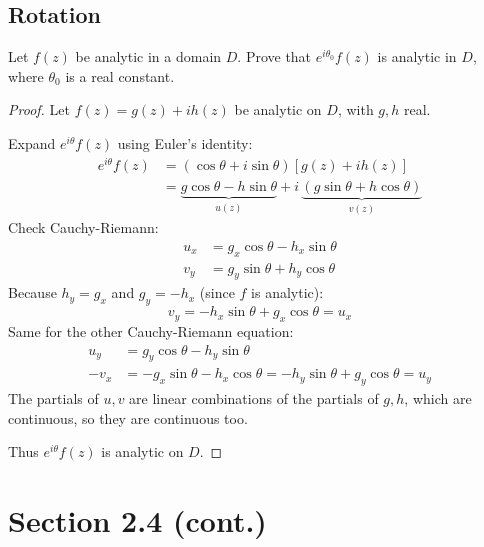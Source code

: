 \documentclass{article}
\begin{document}
\subsection*{Rotation}
Let $f(z)$ be analytic in a domain $D$. Prove that $e^{i\theta_0} f(z)$ is
analytic in $D$, where $\theta_0$ is a real constant.
\begin{proof}
  Let $f(z) = g(z) + ih(z)$ be analytic on $D$, with $g, h$ real.

  Expand $e^{i\theta} f(z)$ using Euler's identity:
  \begin{align*}
    e^{i\theta} f(z)
    &= (\cos\theta + i\sin\theta)\left[g(z) + ih(z)\right]
    \\ &= \underbrace{g\cos\theta - h\sin\theta}_{u(z)}
       + i\,\underbrace{\left(g\sin\theta + h\cos\theta\right)}_{v(z)}
  \end{align*}
  Check Cauchy-Riemann:
  \begin{align*}
    u_x &= g_x\cos\theta - h_x\sin\theta
    \\ v_y &= g_y\sin\theta + h_y\cos\theta
  \end{align*}
  Because $h_y = g_x$ and $g_y = -h_x$ (since $f$ is analytic):
  \[
    v_y = -h_x\sin\theta + g_x\cos\theta = u_x
  \]
  Same for the other Cauchy-Riemann equation:
  \begin{align*}
    u_y &= g_y\cos\theta - h_y\sin\theta
    \\ -v_x &= -g_x\sin\theta - h_x\cos\theta = -h_y\sin\theta + g_y\cos\theta = u_y
  \end{align*}
  The partials of $u, v$ are linear combinations of the partials of $g, h$, which
  are continuous, so they are continuous too.

  Thus $e^{i\theta} f(z)$ is analytic on $D$.
\end{proof}

\section*{Section 2.4 (cont.)}
\end{document}
